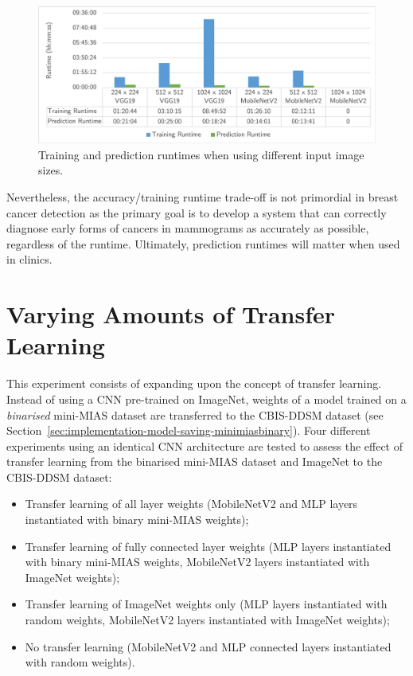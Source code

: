 \begin{figure}[H]
\centerline{\includegraphics[width=\textwidth]{figures/evaluation/image_size_experiment/runtimes.png}}
\caption{\label{fig:evaluation-image_size_experiment-runtimes}Training and prediction runtimes when using different input image sizes.}
\end{figure}

Nevertheless, the accuracy/training runtime trade-off is not primordial in breast cancer detection as the primary goal is to develop a system that can correctly diagnose early forms of cancers in mammograms as accurately as possible, regardless of the runtime. Ultimately, prediction runtimes will matter when used in clinics.


\section{Varying Amounts of Transfer Learning}
\label{sec:evaluation-transfer-learning}

This experiment consists of expanding upon the concept of transfer learning. Instead of using a CNN pre-trained on ImageNet, weights of a model trained on a \textit{binarised} mini-MIAS dataset are transferred to the CBIS-DDSM dataset (see Section~\ref{sec:implementation-model-saving-minimiasbinary}). Four different experiments using an identical CNN architecture are tested to assess the effect of transfer learning from the binarised mini-MIAS dataset and ImageNet to the CBIS-DDSM dataset:
\begin{itemize}
    \item Transfer learning of all layer weights (MobileNetV2 and MLP layers instantiated with binary mini-MIAS weights);
    \item Transfer learning of fully connected layer weights (MLP layers instantiated with binary mini-MIAS weights, MobileNetV2 layers instantiated with ImageNet weights);
    \item Transfer learning of ImageNet weights only (MLP layers instantiated with random weights, MobileNetV2 layers instantiated with ImageNet weights);
    \item No transfer learning (MobileNetV2 and MLP connected layers instantiated with random weights).
\end{itemize}


